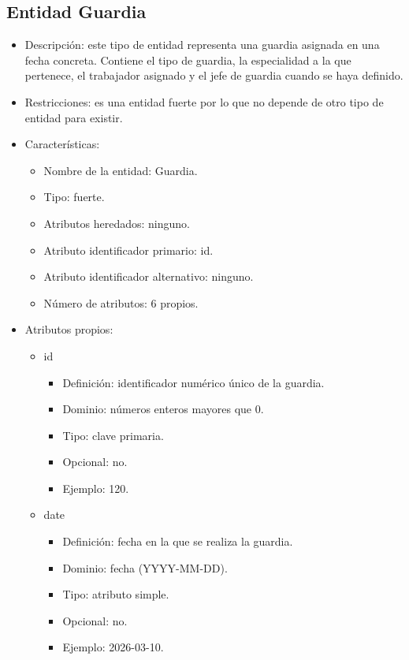 \subsection{Entidad Guardia}
\begin{itemize}
    \item Descripción: este tipo de entidad representa una guardia asignada en una fecha concreta. Contiene el tipo de guardia, la especialidad a la que pertenece, el trabajador asignado y el jefe de guardia cuando se haya definido.
    \item Restricciones: es una entidad fuerte por lo que no depende de otro tipo de entidad para existir.
    \item Características:
    \begin{itemize}
        \item Nombre de la entidad: Guardia.
        \item Tipo: fuerte.
        \item Atributos heredados: ninguno.
        \item Atributo identificador primario: id.
        \item Atributo identificador alternativo: ninguno.
        \item Número de atributos: 6 propios.
    \end{itemize}

    \item Atributos propios:
    \begin{itemize}
        \item id
        \begin{itemize}
            \item Definición: identificador numérico único de la guardia.
            \item Dominio: números enteros mayores que 0.
            \item Tipo: clave primaria.
            \item Opcional: no.
            \item Ejemplo: 120.
        \end{itemize}

        \item date
        \begin{itemize}
            \item Definición: fecha en la que se realiza la guardia.
            \item Dominio: fecha (YYYY-MM-DD).
            \item Tipo: atributo simple.
            \item Opcional: no.
            \item Ejemplo: 2026-03-10.
        \end{itemize}


\end{itemize}
\end{itemize}
